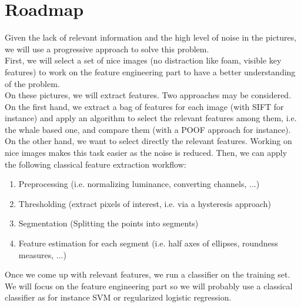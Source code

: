 \documentclass[11pt,a4paper,oneside]{report}
\begin{document}
\section*{Roadmap}
Given the lack of relevant information and the high level of noise in the pictures, we will use a progressive approach to solve this problem. \\
First, we will select a set of nice images (no distraction like foam, visible key features) to work on the feature engineering part to have a better understanding of the problem.\\
On these pictures, we will extract features. Two approaches may be considered. On the first hand, we extract a bag of features for each image (with SIFT for instance) and apply an algorithm to select the relevant features among them, i.e. the whale based one, and compare them (with a POOF approach for instance). On the other hand, we want to select directly the relevant features. Working on nice images makes this task easier as the noise is reduced. Then, we can apply the following classical feature extraction workflow:
\begin{enumerate}
	\item Preprocessing (i.e. normalizing luminance, converting channels, ...)
	\item Thresholding (extract pixels of interest, i.e. via a hysteresis approach)
   	\item Segmentation (Splitting the points into segments)
    	\item Feature estimation for each segment (i.e. half axes of ellipses, roundness measures, ...)
\end{enumerate}
Once we come up with relevant features, we run a classifier on the training set. We will focus on the feature engineering part so we will probably use a classical classifier as for instance SVM or regularized logistic regression. 
\end{document}
